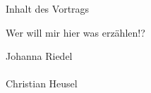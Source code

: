 



\begin{frame}[fragile]
    \maketitle{}
\end{frame}

\begin{frame}{Inhalt des Vortrags}
    \begin{minipage}[t]{0.515\textwidth}
        \tableofcontents[sections={1-5}]
    \end{minipage}
    \begin{minipage}[t]{0.475\textwidth}
        \tableofcontents[hideallsubsections, sections={6-11}]
    \end{minipage}
\end{frame}

\begin{frame}{Wer will mir hier was erzählen!?}
    \vfill
    \begin{center}
        {\Large Johanna Riedel} \\
         \\
        \vspace{1em}
        {\Large Christian Heusel } \\
         \\
    \end{center}
\end{frame}


